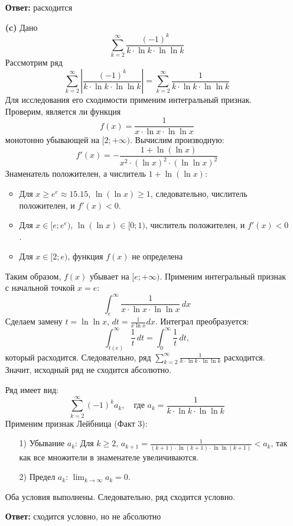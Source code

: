 \documentclass[a4paper]{article}
\renewcommand{\geq}{\geqslant}
\begin{document}
\begin{enumerate}
  \textbf{Ответ: } расходится\\



  \item[\textbf{(c)}]Дано
  $$\sum_{k=2}^{\infty} \frac{(-1)^k}{k \cdot \ln k \cdot \ln \ln k} $$
  Рассмотрим ряд
  \[
  \sum_{k=2}^{\infty} \left| \frac{(-1)^k}{k \cdot \ln k \cdot \ln \ln k} \right| 
  = \sum_{k=2}^{\infty} \frac{1}{k \cdot \ln k \cdot \ln \ln k}
  \]
  Для исследования его сходимости применим интегральный признак. Проверим, является ли функция
  \[
  f(x) = \frac{1}{x \cdot \ln x \cdot \ln \ln x}
  \]
  монотонно убывающей на $[2; +\infty)$. Вычислим производную:
  \[
  f'(x) = -\frac{1 + \ln(\ln x)}{x^2 \cdot (\ln x)^2 \cdot (\ln \ln x)^2}
  \]
  Знаменатель положителен, а числитель $1 + \ln(\ln x)$:
  \begin{itemize}
    \item Для $x \geq e^e \approx 15.15$, $\ln(\ln x) \geq 1$, следовательно, числитель положителен, и $f'(x) < 0$.
    \item Для $x \in [e; e^e)$, $\ln(\ln x) \in [0; 1)$, числитель положителен, и $f'(x) < 0$.
    \item Для $x \in [2; e)$, функция $f(x)$ не определена 
  \end{itemize}
  Таким образом, $f(x)$ убывает на $[e; +\infty)$. Применим интегральный признак с 
  начальной точкой $x = e$:
  \[
  \int_{e}^{\infty} \frac{1}{x \cdot \ln x \cdot \ln \ln x} \, dx
  \]
  Сделаем замену $t = \ln \ln x$, $dt = \frac{1}{x \ln x} dx$. Интеграл преобразуется:
  \[
  \int_{t(e)}^{\infty} \frac{1}{t} \, dt = \int_{0}^{\infty} \frac{1}{t} \, dt,
  \]
  который расходится. Следовательно, ряд
   $\sum_{k=2}^{\infty} \frac{1}{k \cdot \ln k \cdot \ln \ln k}$ расходится.
    Значит, исходный ряд не сходится абсолютно.

  Ряд имеет вид:
  \[
  \sum_{k=2}^{\infty} (-1)^k a_k, \quad \text{где } a_k = 
  \frac{1}{k \cdot \ln k \cdot \ln \ln k}
  \]
  Применим признак Лейбница (Факт 3):
  \begin{enumerate}
    \item[1)] Убывание $a_k$: Для $k \geq 2$, $a_{k+1} = \frac{1}{(k+1) 
    \cdot \ln(k+1) \cdot \ln \ln(k+1)} < a_k$, так как все
    множители в знаменателе увеличиваются.
    \item[2)] Предел $a_k$: $\lim_{k \to \infty} a_k = 0$.
  \end{enumerate}

  Оба условия выполнены. Следовательно, ряд сходится условно.
  
  \textbf{Ответ: } сходится условно, но не абсолютно\\

\end{enumerate}
\end{document}
